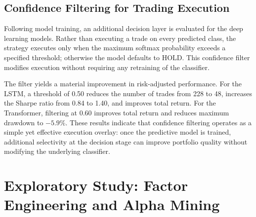 \documentclass[12pt]{article}
\begin{document}
\subsection{Confidence Filtering for Trading Execution}

Following model training, an additional decision layer is evaluated for the deep learning models. Rather than executing a trade on every predicted class, the strategy executes only when the maximum softmax probability exceeds a specified threshold; otherwise the model defaults to HOLD. This confidence filter modifies execution without requiring any retraining of the classifier.

The filter yields a material improvement in risk-adjusted performance. For the LSTM, a threshold of 0.50 reduces the number of trades from 228 to 48, increases the Sharpe ratio from 0.84 to 1.40, and improves total return. For the Transformer, filtering at 0.60 improves total return and reduces maximum drawdown to $-5.9\%$. These results indicate that confidence filtering operates as a simple yet effective execution overlay: once the predictive model is trained, additional selectivity at the decision stage can improve portfolio quality without modifying the underlying classifier.

\begin{table}[H]
    \centering
    \scriptsize
    \caption{Trading results before and after confidence filtering for the deep models.}
\end{table}

\section{Exploratory Study: Factor Engineering and Alpha Mining}
\end{document}
